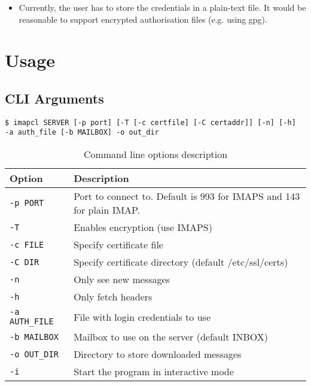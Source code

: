 \documentclass[a4]{report}
\begin{document}
\begin{itemize}
  \item Currently, the user has to store the credentials in a plain-text file. It would be reasonable to support encrypted authorisation files (e.g. using gpg).
\end{itemize}

\chapter{Usage}

\section{CLI Arguments}

\begin{mdframed}
\begin{verbatim}
$ imapcl SERVER [-p port] [-T [-c certfile] [-C certaddr]] [-n] [-h]
-a auth_file [-b MAILBOX] -o out_dir
\end{verbatim}
\end{mdframed}

\begin{table}[h]
  \renewcommand*{\arraystretch}{1.0}
  \centering
  \begin{tabular}{|l|l|}
    \hline
    \rowcolor{lightgray}
    Option & Description\\
    \hline
    \texttt{-p PORT}      & Port to connect to. Default is 993 for IMAPS and 143 for plain IMAP.\\
    \texttt{-T}          & Enables encryption (use IMAPS)\\
    \texttt{-c FILE}     & Specify certificate file\\
    \texttt{-C DIR}      & Specify certificate directory (default /etc/ssl/certs)\\
    \texttt{-n}          & Only see new messages\\
    \texttt{-h}          & Only fetch headers\\
    \texttt{-a AUTH\_FILE}& File with login credentials to use\\
    \texttt{-b MAILBOX}  & Mailbox to use on the server (default INBOX)\\
    \texttt{-o OUT\_DIR}  & Directory to store downloaded messages\\
    \texttt{-i}          & Start the program in interactive mode\\
    \hline
  \end{tabular}
  \caption{Command line options description}
\end{table}
\end{document}
